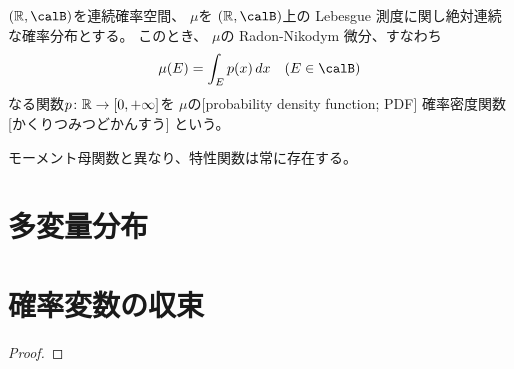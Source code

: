 \documentclass[report]{jlreq}
\begin{document}
\begin{definition}[絶対連続分布]
    \TODO{}
\end{definition}

\begin{definition}[確率密度関数]
    $(\R, \calB)$を連続確率空間、
    $\mu$を
    $(\R, \calB)$上の Lebesgue 測度に関し絶対連続な確率分布とする。
    このとき、
    $\mu$の Radon-Nikodym 微分、すなわち
    \begin{equation}
        \mu(E)
            = \int_E p(x) \, dx
            \quad (E \in \calB)
    \end{equation}
    なる関数$p \colon \mathbb{R} \to [0, +\infty]$を
    $\mu$の[probability density function; PDF]
        {確率密度関数}[かくりつみつどかんすう]
    という。
\end{definition}

\begin{definition}[モーメント母関数]
    \TODO{}
\end{definition}

モーメント母関数と異なり、特性関数は常に存在する。

\begin{definition}[特性関数]
    \TODO{}
\end{definition}

%
\section{多変量分布}

\TODO{}

%
\section{確率変数の収束}

\begin{theorem}[大数の法則]
    \TODO{}
\end{theorem}

\begin{proof}
    \TODO{}
\end{proof}

\begin{theorem}[中心極限定理]
    \TODO{}
\end{theorem}
\end{document}
